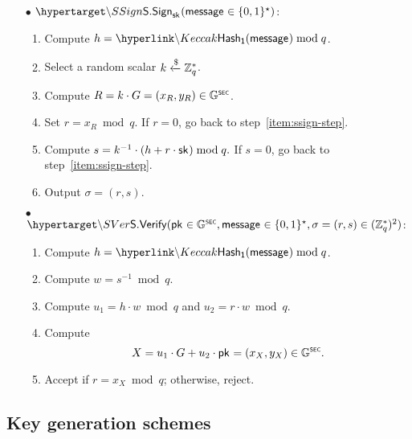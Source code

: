 \begin{mdframed}
	\begin{minipage}[t]{0.45\textwidth}
		\begin{itemize}
			\item[$\bullet$] $\hlset{\SSign}_{\sk}(\msg \in \{0,1\}^\star)$:  \vspace{0.1cm}
			\begin{enumerate}
				\item Compute $h = \hlget{\Keccak}(\msg) \bmod q$.
				\item\label{item:ssign-step} Select a random scalar $k \xleftarrow{\$} \mathbb{Z}_q^{*}$.
				\item Compute $R = k \cdot G = (x_R, y_R) \in {\ensuremath{\mathbb{G}}}^{\text{\tiny \sf SEC}}$.
				\item Set $r = x_R \bmod q$. If $r = 0$, go back to step~\ref{item:ssign-step}. 
				\item Compute $s = k^{-1} \cdot (h + r \cdot {\sf{sk}^{}}) \bmod q.$ If $s = 0$, go back to step~\ref{item:ssign-step}. 
				\item Output $\sigma = (r, s)$.
			\end{enumerate}
		\end{itemize}
	\end{minipage}
	\begin{minipage}[t]{0.55\textwidth}
		\begin{itemize}
			\item[$\bullet$] $\hlset{\SVer}(\pk \in \SEC{\G},\msg \in \{0,1\}^\star, \sigma = (r, s)\in(\Z_q^*)^2)$: %
			\begin{enumerate}
				\item Compute $h = \hlget{\Keccak}(\msg) \bmod q$.
				\item Compute $w = s^{-1} \bmod q$.
				\item Compute $u_1 = h \cdot w \bmod q$ and $u_2 = r \cdot w \bmod q$.
				\item Compute $$X = u_1 \cdot G + u_2 \cdot {\sf{pk}^{}} = (x_X, y_X) \in {\ensuremath{\mathbb{G}}}^{\text{\tiny \sf SEC}}.$$
				\item Accept if $r = x_X \bmod q$; otherwise, reject.
			\end{enumerate}
		\end{itemize}
	\end{minipage}
\end{mdframed}


\subsection{Key generation schemes}
\label{sec:cryptographic-primitives:dkg}

